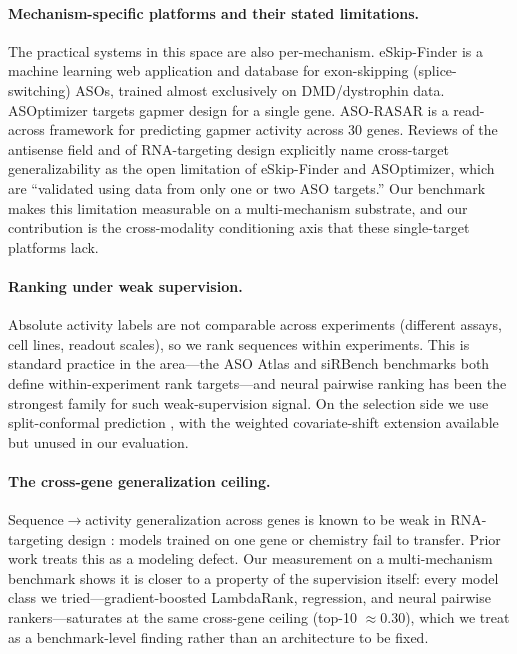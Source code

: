\documentclass{article} %
\begin{document}
\paragraph{Mechanism-specific platforms and their stated limitations.}
The practical systems in this space are also per-mechanism. eSkip-Finder \citep{chiba2021} is a machine learning web application and database for exon-skipping (splice-switching) ASOs, trained almost exclusively on DMD/dystrophin data. ASOptimizer \citep{hwang2024} targets gapmer design for a single gene. ASO-RASAR \citep{hwang2026} is a read-across framework for predicting gapmer activity across 30 genes. Reviews of the antisense field \citep{crooke2021} and of RNA-targeting design \citep{leckie2025} explicitly name cross-target generalizability as the open limitation of eSkip-Finder and ASOptimizer, which are ``validated using data from only one or two ASO targets.'' Our benchmark makes this limitation measurable on a multi-mechanism substrate, and our contribution is the cross-modality conditioning axis that these single-target platforms lack.

\paragraph{Ranking under weak supervision.}
Absolute activity labels are not comparable across experiments (different assays, cell lines, readout scales), so we rank sequences within experiments. This is standard practice in the area---the ASO Atlas \citep{hill2025} and siRBench \citep{karmakar2026} benchmarks both define within-experiment rank targets---and neural pairwise ranking has been the strongest family for such weak-supervision signal. On the selection side we use split-conformal prediction \citep{vovk2005}, with the weighted covariate-shift extension \citep{tibshirani2019} available but unused in our evaluation.

\paragraph{The cross-gene generalization ceiling.}
Sequence$\rightarrow$activity generalization across genes is known to be weak in RNA-targeting design \citep{bai2024,hwang2024,leckie2025,hwang2026}: models trained on one gene or chemistry fail to transfer. Prior work treats this as a modeling defect. Our measurement on a multi-mechanism benchmark shows it is closer to a property of the supervision itself: every model class we tried---gradient-boosted LambdaRank, regression, and neural pairwise rankers---saturates at the same cross-gene ceiling (top-10 $\approx 0.30$), which we treat as a benchmark-level finding rather than an architecture to be fixed.
\end{document}
